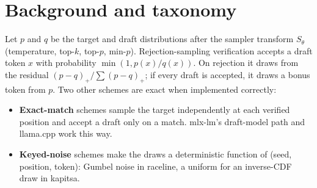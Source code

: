 \documentclass[10pt]{article}
\theoremstyle{remark}
\begin{document}
\section{Background and taxonomy}\label{sec:taxonomy}
Let $p$ and $q$ be the target and draft distributions after the sampler transform $S_\theta$ (temperature, top-$k$, top-$p$, min-$p$). Rejection-sampling verification accepts a draft token $x$ with probability $\min(1,p(x)/q(x))$. On rejection it draws from the residual $(p-q)_+/\sum(p-q)_+$; if every draft is accepted, it draws a bonus token from $p$. Two other schemes are exact when implemented correctly:
\begin{itemize}
\item \textbf{Exact-match} schemes sample the target independently at each verified position and accept a draft only on a match. mlx-lm's draft-model path and llama.cpp work this way.
\item \textbf{Keyed-noise} schemes make the draws a deterministic function of (seed, position, token): Gumbel noise in raceline, a uniform for an inverse-CDF draw in kapitsa.
\end{itemize}
\end{document}
